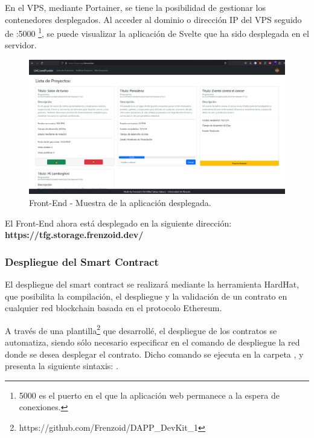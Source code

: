 En el VPS, mediante Portainer, se tiene la posibilidad de gestionar los contenedores desplegados. Al acceder al dominio o dirección IP del VPS seguido de :5000 \footnote{5000 es el puerto en el que la aplicación web permanece a la espera de conexiones.}, se puede visualizar la aplicación de Svelte que ha sido desplegada en el servidor.


\begin{figure}[H]
        \centering
        \includegraphics[width=1\textwidth]{img/capturas/frontendtfg.png}
        \caption{Front-End - Muestra de la aplicación desplegada.}
        \label{fig:configApi}
\end{figure}

El Front-End ahora está desplegado en la siguiente dirección: \textbf{https://tfg.storage.frenzoid.dev/}

\newpage

\subsubsection{Despliegue del Smart Contract}

El despliegue del smart contract se realizará mediante la herramienta HardHat, que posibilita la compilación, el despliegue y la validación de un contrato en cualquier red blockchain basada en el protocolo Ethereum.

\bigskip

A través de una plantilla\footnote{https://github.com/Frenzoid/DAPP\_DevKit\_1} que desarrollé, el despliegue de los contratos se automatiza, siendo sólo necesario especificar en el comando de despliegue la red donde se desea desplegar el contrato. Dicho comando se ejecuta en la carpeta , y presenta la siguiente sintaxis: .

\bigskip

